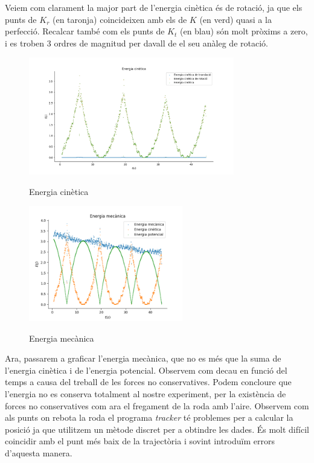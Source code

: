 \documentclass[11pt]{article}
\begin{document}
    Veiem com clarament la major part de l'energia cinètica és de rotació, ja que els punts de $K_r$ (en taronja) coincideixen amb els de $K$ (en verd) quasi a la perfecció. Recalcar també com els punts de $K_t$ (en blau) són molt pròxims a zero, i es troben 3 ordres de magnitud per davall de el seu anàleg de rotació.
    \begin{figure}[h]
        \vspace{-0.2cm}
        \begin{center}
            \includegraphics[width=0.8\textwidth]{fotos/energias/k.png}
            \label{fig:k}
            \caption{Energia cinètica}
        \end{center}
    \end{figure}

    \begin{figure}
        \vspace{-1.2cm}
        \begin{center}
            \includegraphics[width=0.6\textwidth]{fotos/energias/e.png}
            \label{fig:e}
            \vspace{-0.2cm}
            \caption{Energia mecànica}
        \end{center}
    \end{figure}

    Ara, passarem a graficar l'energia mecànica, que no es més que la suma de l'energia cinètica i de l'energia potencial. Observem com decau en funció del temps a causa del treball de les forces no conservatives. Podem concloure que l'energia no es conserva totalment al nostre experiment, per la existència de forces no conservatives com ara el fregament de la roda amb l'aire. Observem com als punts on rebota la roda el programa \textit{tracker} té problemes per a calcular la posició ja que utilitzem un mètode discret per a obtindre les dades. És molt difícil coincidir amb el punt més baix de la trajectòria i sovint introduïm errors d'aquesta manera.
    
\end{document}
